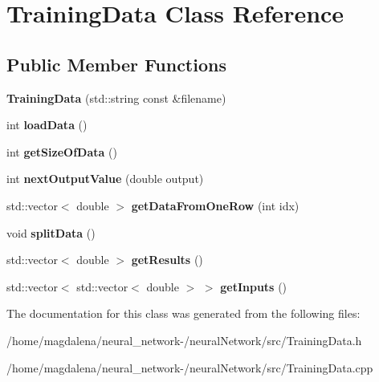 \hypertarget{classTrainingData}{}\section{Training\+Data Class Reference}
\label{classTrainingData}
\subsection*{Public Member Functions}
\begin{DoxyCompactItemize}
\item 
\mbox{\label{classTrainingData_a64e80f943b98acce134824f40689cfb8}} 
{\bfseries Training\+Data} (std\+::string const \&filename)
\item 
\mbox{\label{classTrainingData_a4550118e30a983fb12158b54752445c8}} 
int {\bfseries load\+Data} ()
\item 
\mbox{\label{classTrainingData_a35b1501f0710acc3c402893a409ace6c}} 
int {\bfseries get\+Size\+Of\+Data} ()
\item 
\mbox{\label{classTrainingData_ad99f4428d6077419bb6a8452205693c0}} 
int {\bfseries next\+Output\+Value} (double output)
\item 
\mbox{\label{classTrainingData_a69f531f39a49988ef21b6fabfa06f82e}} 
std\+::vector$<$ double $>$ {\bfseries get\+Data\+From\+One\+Row} (int idx)
\item 
\mbox{\label{classTrainingData_ab5d2eb8782e49d7fe40d9261ae21d6e9}} 
void {\bfseries split\+Data} ()
\item 
\mbox{\label{classTrainingData_abeab409eacf5b0edfb5d1c1d9f18e552}} 
std\+::vector$<$ double $>$ {\bfseries get\+Results} ()
\item 
\mbox{\label{classTrainingData_a482f15e71cff8363debaf5a546be8b90}} 
std\+::vector$<$ std\+::vector$<$ double $>$ $>$ {\bfseries get\+Inputs} ()
\end{DoxyCompactItemize}


The documentation for this class was generated from the following files\+:\begin{DoxyCompactItemize}
\item 
/home/magdalena/neural\+\_\+network-\//neural\+Network/src/Training\+Data.\+h\item 
/home/magdalena/neural\+\_\+network-\//neural\+Network/src/Training\+Data.\+cpp\end{DoxyCompactItemize}
